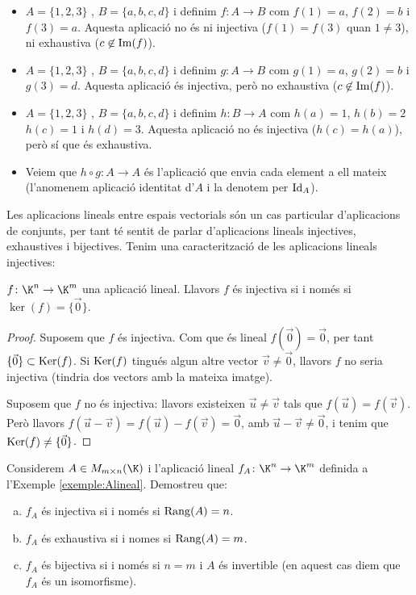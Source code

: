 \begin{exemple}
	\begin{itemize}
		\item $A=\{1,2,3\}$ , $B=\{a,b,c,d\}$ i definim $f\colon A \to B$ com $f(1)=a$, $f(2)=b$ i $f(3)=a$. Aquesta aplicació no és ni injectiva ($f(1)=f(3)$ quan $1\neq 3$), ni exhaustiva ($c\not\in \operatorname{Im}(f)$).
		\item $A=\{1,2,3\}$ , $B=\{a,b,c,d\}$ i definim $g\colon A \to B$ com $g(1)=a$, $g(2)=b$ i $g(3)=d$. Aquesta aplicació és injectiva, però no exhaustiva ($c\not\in \operatorname{Im}(f)$).
		\item $A=\{1,2,3\}$ , $B=\{a,b,c,d\}$ i definim $h\colon B \to A$ com $h(a)=1$, $h(b)=2$ $h(c)=1$ i $h(d)=3$. Aquesta aplicació no és injectiva ($h(c)=h(a)$), però sí que és  exhaustiva.
		\item Veiem que $h\circ g \colon A \to A$ és l'aplicació que envia cada element a ell mateix (l'anomenem aplicació identitat d'$A$ i la denotem per $\operatorname{Id}_A$).
	\end{itemize}
\end{exemple}

Les aplicacions lineals entre espais vectorials són un cas particular d'aplicacions de conjunts, per tant té sentit de parlar d'aplicacions lineals injectives, exhaustives i bijectives. Tenim una caracterització de les aplicacions lineals injectives:
\begin{lema}
	$f \colon \K^n \to \K^m$ una aplicació lineal. Llavors $f$ és injectiva si i només si $\ker(f)=\{\vec 0\}$.
\end{lema}
\begin{proof}
	Suposem que $f$ és injectiva. Com que és lineal $f(\vec 0)=\vec 0$, per tant $\{\vec 0\} \subset \operatorname{Ker}(f)$. Si $\operatorname{Ker}(f)$ tingués algun altre vector $\vec v \neq \vec 0$, llavors $f$ no seria injectiva (tindria dos vectors amb la mateixa imatge).
	
	Suposem que $f$ no és injectiva: llavors existeixen $\vec u \neq \vec v$ tals que $f(\vec u)=f(\vec v)$. Però llavors $f(\vec u- \vec v)=f(\vec u)-f(\vec v)=\vec 0$, amb $\vec u-\vec v\neq \vec 0$, i tenim que $\operatorname{Ker}(f)\neq \{\vec 0\}$.
\end{proof}

\begin{exercici}
	Considerem $A \in M_{m\times n}(\K)$ i l'aplicació lineal $f_A\colon \K^n\to \K^m$ definida a l'Exemple \ref{exemple:Alineal}. Demostreu que:
	\begin{enumerate}[(a)]
		\item $f_A$ és injectiva si i només si $\operatorname{Rang}(A)=n$.
		\item $f_A$ és exhaustiva si i nomes si $\operatorname{Rang}(A)=m$.
		\item $f_A$ és bijectiva si i només si $n=m$ i $A$ és invertible (en aquest cas diem que $f_A$ és un isomorfisme).
	\end{enumerate}
\end{exercici}

